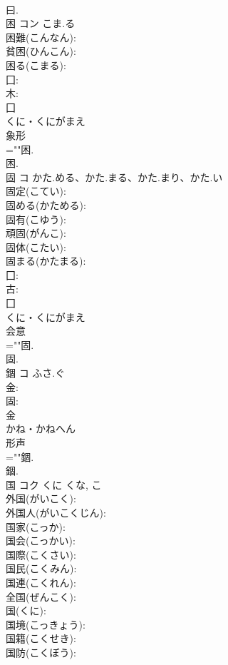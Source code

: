 \documentclass[8pt]{extreport}
\begin{document}
\begin{CJK}{UTF8}{min}
\\	曰.
\\	困	コン	こま.る		
\\	困難(こんなん): 
\\	貧困(ひんこん): 
\\	困る(こまる): 
\\	囗: 
\\	木: 
\\	囗	
\\	くに・くにがまえ	
\\	象形 
\\	=""困.
\\	困.
\\	固	コ	かた.める、かた.まる、かた.まり、かた.い		
\\	固定(こてい): 
\\	固める(かためる): 
\\	固有(こゆう): 
\\	頑固(がんこ): 
\\	固体(こたい): 
\\	固まる(かたまる): 
\\	囗: 
\\	古: 
\\	囗	
\\	くに・くにがまえ	
\\	会意 
\\	=""固.
\\	固.
\\	錮	コ	ふさ.ぐ		
\\	金: 
\\	固: 
\\	金	
\\	かね・かねへん	
\\	形声 
\\	=""錮.
\\	錮.
\\	国	コク	くに	くな, こ	
\\	外国(がいこく): 
\\	外国人(がいこくじん): 
\\	国家(こっか): 
\\	国会(こっかい): 
\\	国際(こくさい): 
\\	国民(こくみん): 
\\	国連(こくれん): 
\\	全国(ぜんこく): 
\\	国(くに): 
\\	国境(こっきょう): 
\\	国籍(こくせき): 
\\	国防(こくぼう): 

\end{CJK}
\end{document}
